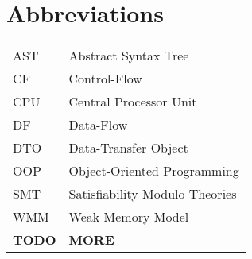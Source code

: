 \chapter*{Abbreviations}


\noindent
\begin{longtable}{@{}p{}p{}@{}}
AST & Abstract Syntax Tree \\
CF  & Control-Flow \\
CPU & Central Processor Unit \\
DF  & Data-Flow \\
DTO & Data-Transfer Object \\
OOP & Object-Oriented Programming \\
SMT & Satisfiability Modulo Theories \\
WMM & Weak Memory Model \\
\textbf{TODO} & \textbf{MORE}
\end{longtable}

